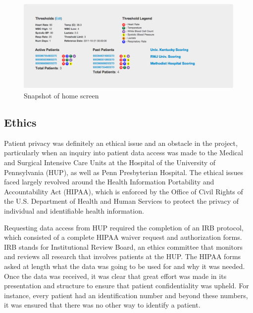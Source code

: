 \documentclass{sig-alternate}
\begin{document}
\begin{figure}
	\begin{center}
		\includegraphics[width=1.0\linewidth]{home.png}
	\end{center}
	\caption{Snapshot of home screen}
	\label{fig:home}
\end{figure}

\vspace{10pt}
\subsection{Ethics}
\label{subsec:ethics}
\vspace{10pt}

Patient privacy was definitely an ethical issue and an obstacle in the project, particularly when an inquiry into patient data access was made to the Medical and Surgical Intensive Care Units at the Hospital of the University of Pennsylvania (HUP), as well as Penn Presbyterian Hospital. The ethical issues faced largely revolved around the Health Information Portability and Accountability Act (HIPAA), which is enforced by the Office of Civil Rights of the U.S. Department of Health and Human Services to protect the privacy of individual and identifiable health information.

Requesting data access from HUP required the completion of an IRB protocol, which consisted of a complete HIPAA waiver request and authorization forms. IRB stands for Institutional Review Board, an ethics committee that monitors and reviews all research that involves patients at the HUP. The HIPAA forms asked at length what the data was going to be used for and why it was needed. Once the data was received, it was clear that great effort was made in its presentation and structure to ensure that patient confidentiality was upheld. For instance, every patient had an identification number and beyond these numbers, it was ensured that there was no other way to identify a patient. 
\end{document}
